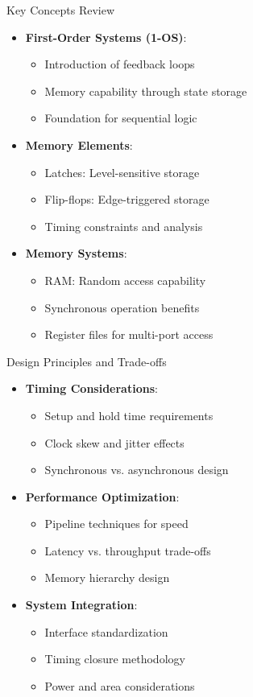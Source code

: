 \documentclass[aspectratio=169,11pt]{beamer}
\newcommand{\concept}[1]{\textbf{\color{accentcolor}#1}}
\begin{document}
\begin{frame}{Key Concepts Review}
\begin{itemize}
\item \concept{First-Order Systems (1-OS)}:
\begin{itemize}
\item Introduction of feedback loops
\item Memory capability through state storage
\item Foundation for sequential logic
\end{itemize}
\vspace{0.3cm}
\item \concept{Memory Elements}:
\begin{itemize}
\item Latches: Level-sensitive storage
\item Flip-flops: Edge-triggered storage
\item Timing constraints and analysis
\end{itemize}
\vspace{0.3cm}
\item \concept{Memory Systems}:
\begin{itemize}
\item RAM: Random access capability
\item Synchronous operation benefits
\item Register files for multi-port access
\end{itemize}
\end{itemize}
\end{frame}

\begin{frame}{Design Principles and Trade-offs}
\begin{itemize}
\item \concept{Timing Considerations}:
\begin{itemize}
\item Setup and hold time requirements
\item Clock skew and jitter effects
\item Synchronous vs. asynchronous design
\end{itemize}
\vspace{0.3cm}
\item \concept{Performance Optimization}:
\begin{itemize}
\item Pipeline techniques for speed
\item Latency vs. throughput trade-offs
\item Memory hierarchy design
\end{itemize}
\vspace{0.3cm}
\item \concept{System Integration}:
\begin{itemize}
\item Interface standardization
\item Timing closure methodology
\item Power and area considerations
\end{itemize}
\end{itemize}
\end{frame}
\end{document}
